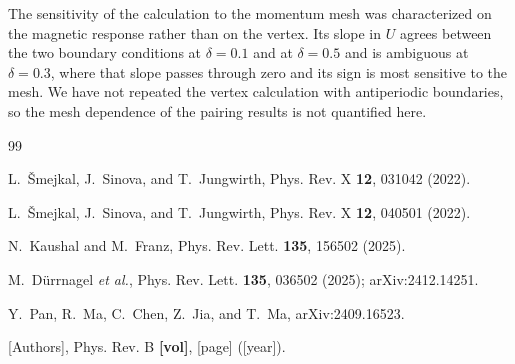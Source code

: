 \documentclass[aps,prb,reprint,superscriptaddress,amsmath,amssymb,floatfix]{revtex4-2}
\begin{document}
The sensitivity of the calculation to the momentum mesh was characterized on the
magnetic response rather than on the vertex. Its slope in $U$ agrees between the
two boundary conditions at $\delta = 0.1$ and at $\delta = 0.5$ and is ambiguous
at $\delta = 0.3$, where that slope passes through zero and its sign is most
sensitive to the mesh. We have not repeated the vertex calculation with
antiperiodic boundaries, so the mesh dependence of the pairing results is not
quantified here.

\begin{acknowledgments}
\end{acknowledgments}

\begin{thebibliography}{99}


L.~\v{S}mejkal, J.~Sinova, and T.~Jungwirth,
Phys. Rev. X \textbf{12}, 031042 (2022).

L.~\v{S}mejkal, J.~Sinova, and T.~Jungwirth,
Phys. Rev. X \textbf{12}, 040501 (2022).

N.~Kaushal and M.~Franz,
Phys. Rev. Lett. \textbf{135}, 156502 (2025).

M.~D\"urrnagel \textit{et al.},
Phys. Rev. Lett. \textbf{135}, 036502 (2025);
arXiv:2412.14251.

Y.~Pan, R.~Ma, C.~Chen, Z.~Jia, and T.~Ma,
arXiv:2409.16523.

[Authors], Phys. Rev. B \textbf{[vol]}, [page] ([year]).

\end{thebibliography}
\end{document}

